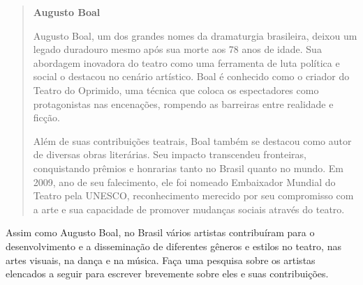 \begin{quote}
\textbf{Augusto Boal}

Augusto Boal, um dos grandes nomes da dramaturgia brasileira, deixou um legado duradouro mesmo após sua morte aos 78 anos de idade. Sua abordagem inovadora do teatro como uma ferramenta de luta política e social o destacou no cenário artístico. Boal é conhecido como o criador do Teatro do Oprimido, uma técnica que coloca os espectadores como protagonistas nas encenações, rompendo as barreiras entre realidade e ficção.

Além de suas contribuições teatrais, Boal também se destacou como autor de diversas obras literárias. Seu impacto transcendeu fronteiras, conquistando prêmios e honrarias tanto no Brasil quanto no mundo. Em 2009, ano de seu falecimento, ele foi nomeado Embaixador Mundial do Teatro pela UNESCO, reconhecimento merecido por seu compromisso com a arte e sua capacidade de promover mudanças sociais através do teatro.

\end{quote}

Assim como Augusto Boal, no Brasil vários artistas contribuíram para o
desenvolvimento e a disseminação de diferentes gêneros e estilos no
teatro, nas artes visuais, na dança e na música. Faça uma pesquisa sobre os artistas elencados a seguir para escrever brevemente sobre eles e suas contribuições.

